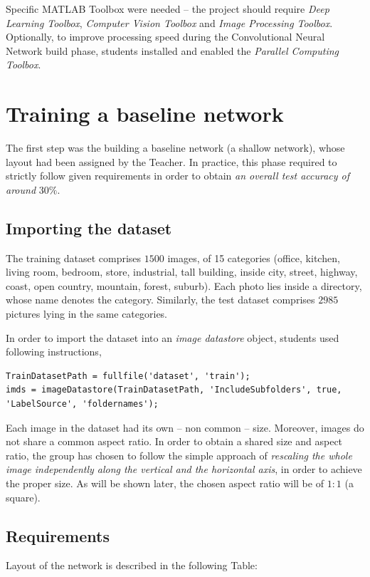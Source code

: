 \documentclass[a4paper, 11pt]{article} %
\begin{document}
Specific MATLAB Toolbox were needed \--- the project should require \emph{Deep Learning Toolbox}, \emph{Computer Vision Toolbox} and \emph{Image Processing Toolbox}. Optionally, to improve processing speed during the Convolutional Neural Network build phase, students installed and enabled the \emph{Parallel Computing Toolbox}.






\section{Training a baseline network}

The first step was the building a baseline network (a shallow network), whose layout had been assigned by the Teacher. In practice, this phase required to strictly follow given requirements in order to obtain \emph{an overall test accuracy of around} $30\%$.

\subsection{Importing the dataset} 

The training dataset comprises $1500$ images, of 15 categories (office, kitchen, living room, bedroom, store, industrial, tall building, inside city, street, highway, coast, open country, mountain, forest, suburb). Each photo lies inside a directory, whose name denotes the category. Similarly, the test dataset comprises $2985$ pictures lying in the same categories.

In order to import the dataset into an \emph{image datastore} object, students used following instructions,

\begin{lstlisting}
TrainDatasetPath = fullfile('dataset', 'train');
imds = imageDatastore(TrainDatasetPath, 'IncludeSubfolders', true, 'LabelSource', 'foldernames');
\end{lstlisting}

Each image in the dataset had its own \--- non common \--- size. Moreover, images do not share a common aspect ratio. In order to obtain a shared size and aspect ratio, the group has chosen to follow the simple approach of \emph{rescaling the whole image independently along the vertical and the horizontal axis}, in order to achieve the proper size. As will be shown later, the chosen aspect ratio will be of $1:1$ (a square).

\subsection{Requirements}
Layout of the network is described in the following Table:
\bigskip
\end{document}
